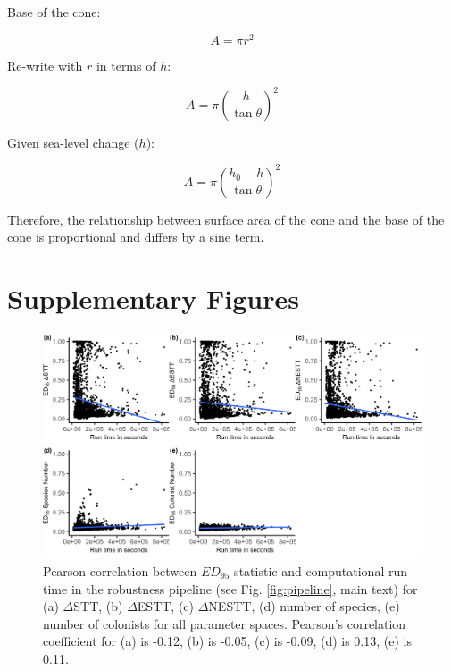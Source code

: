 Base of the cone: 

\[ A = \pi r^2 \]

Re-write with $r$ in terms of $h$:

\[ A = \pi \left( \frac{h}{\tan \theta} \right)^2 \]

Given sea-level change ($h$): 

\[ A = \pi \left( \frac{h_0 - h}{\tan \theta} \right) ^2 \]

Therefore, the relationship between surface area of the cone and the base of the cone is proportional and differs by a sine term.

\clearpage

\section*{Supplementary Figures}

\begin{figure}[ht]
    \centering
    \includegraphics[width=\textwidth]{JBI-21-0508_FigS1.png}
    \caption{Pearson correlation between $ED_{95}$ statistic and computational run time in the robustness pipeline (see Fig. \ref{fig:pipeline}, main text) for (a) $\Delta$STT, (b) $\Delta$ESTT, (c) $\Delta$NESTT, (d) number of species, (e) number of colonists for all parameter spaces. Pearson’s correlation coefficient for (a) is -0.12, (b) is -0.05, (c) is -0.09, (d) is 0.13, (e) is 0.11.}
    \label{fig:runtime_ed95_corr}
\end{figure}


